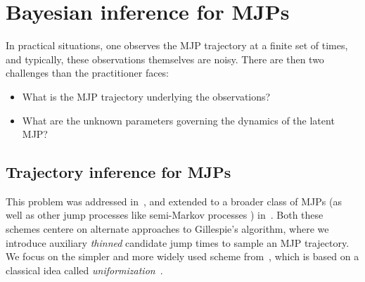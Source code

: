 
\section{Bayesian inference for MJPs}
In practical situations, one observes the MJP trajectory at
a finite set of times, and typically, these observations themselves
are noisy. There are then two challenges than the practitioner faces:
\begin{itemize}
  \item What is the MJP trajectory underlying the observations?
  \item What are the unknown parameters governing the dynamics of the 
    latent MJP?
\end{itemize}

\subsection{Trajectory inference for MJPs}
This problem was addressed in~\cite{RaoTeh13}, and extended to a broader 
class of MJPs (as well as other jump processes like semi-Markov processes
) in~\cite{RaoTeh12}. Both these schemes centere on alternate
approaches to Gillespie's algorithm, where we introduce auxiliary {\em thinned} 
candidate jump times to sample an MJP trajectory. 
We focus on the simpler and more widely used scheme from~\cite{RaoTeh13}, 
which is based on a classical idea called {\em uniformization}~\cite{Jen1953}. 

